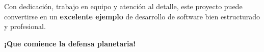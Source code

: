 \documentclass[12pt, a4paper]{article}
\begin{document}
Con dedicación, trabajo en equipo y atención al detalle, este proyecto puede convertirse en un \textbf{excelente ejemplo} de desarrollo de software bien estructurado y profesional.

\vspace{2em}

\begin{center}
    \textcolor{verdeexito}{\Large \textbf{¡Que comience la defensa planetaria!}}
\end{center}
\end{document}

